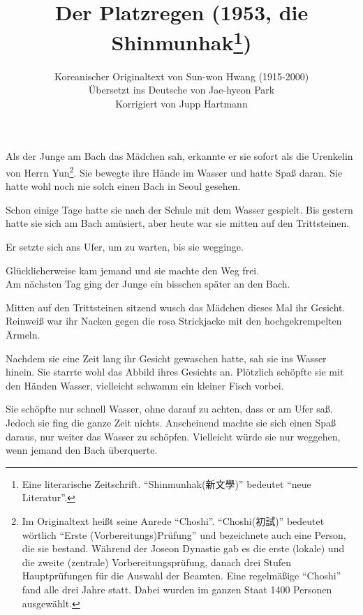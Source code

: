 \documentclass[prd,12pt,tightenlines,notitlepage,nofootinbib]{revtex4-1}
\begin{document}
\title{Der Platzregen (1953, die Shinmunhak\footnote{
Eine literarische Zeitschrift.
"`Shinmunhak({新文學})"' bedeutet
"`neue Literatur"'.
})}
\author{Koreanischer Originaltext von Sun-won Hwang (1915-2000)
\\ Übersetzt ins Deutsche von Jae-hyeon Park
\\ Korrigiert von Jupp Hartmann}
\maketitle

\noindent
Als der Junge am Bach das Mädchen sah, erkannte er sie sofort als die
Urenkelin von Herrn Yun\footnote{Im Originaltext heißt seine Anrede "`Choshi"'.
"`Choshi({初試})"' bedeutet wörtlich "`Erste (Vorbereitungs)Prüfung"' und
bezeichnete auch eine Person, die sie bestand.
Während der Joseon Dynastie gab es
die erste (lokale) und die zweite (zentrale) Vorbereitungsprüfung,
danach drei Stufen Hauptprüfungen für die Auswahl der Beamten.
Eine regelmäßige "`Choshi"' fand alle drei Jahre statt. Dabei wurden
im ganzen Staat 1400 Personen ausgewählt.}.
Sie bewegte ihre Hände im Wasser und hatte
Spaß daran.  Sie hatte wohl noch nie solch einen Bach in Seoul gesehen.

Schon einige Tage hatte sie nach der Schule mit dem Wasser gespielt.
Bis gestern hatte sie sich am Bach amüsiert,
aber heute war sie mitten auf den Trittsteinen.

Er setzte sich ans Ufer, um zu warten, bis sie wegginge.

Glücklicherweise kam
jemand und sie machte den Weg frei.
\\

Am nächsten Tag ging der Junge ein bisschen später an den Bach.

Mitten auf den Trittsteinen sitzend wusch das Mädchen dieses Mal ihr
Gesicht.  Reinweiß war ihr Nacken gegen die rosa
Strickjacke mit den hochgekrempelten Ärmeln.

Nachdem sie eine Zeit lang
ihr Gesicht gewaschen hatte, sah sie ins Wasser hinein.  Sie starrte wohl das
Abbild ihres Gesichts an.  Plötzlich schöpfte sie mit den Händen
Wasser, vielleicht schwamm ein kleiner Fisch vorbei.

Sie schöpfte nur schnell
Wasser, ohne darauf zu achten, dass er am Ufer saß.  Jedoch sie fing
die ganze Zeit nichts.  Anscheinend machte sie sich einen Spaß daraus,
nur weiter das Wasser zu schöpfen.  Vielleicht würde sie nur weggehen,
wenn jemand den Bach überquerte.
\end{document}
